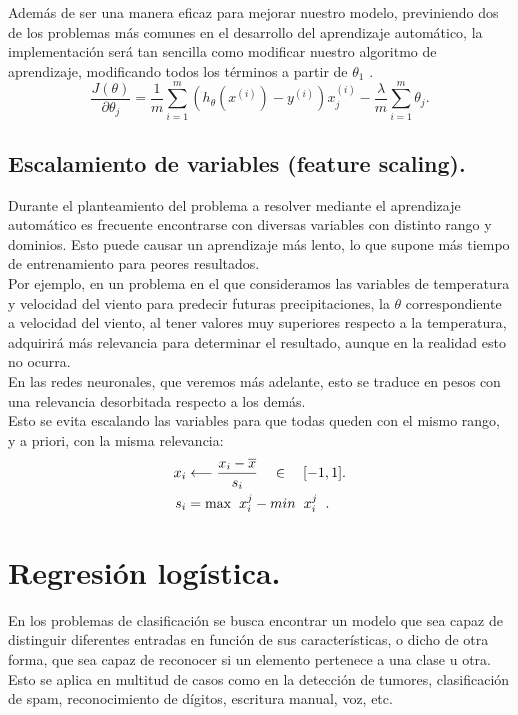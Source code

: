 \documentclass[a4paper,11pt]{article}
\begin{document}
\noindent
Además de ser una manera eficaz para mejorar nuestro modelo, previniendo dos de los problemas más comunes en el desarrollo del aprendizaje automático, la implementación será tan sencilla como modificar nuestro algoritmo de aprendizaje, modificando todos los términos a partir de $\theta_1$ .\\
\begin{equation}
\frac{J(\theta)}{\partial\theta_j} = \frac{1}{m} \sum_{i=1}^{m} \left(h_\theta (x^{(i)})-y^{(i)}\right) x_{j}^{(i)}-\frac{\lambda}{m} \sum_{i=1}^{m} \theta_j.
\end{equation}

\subsection{Escalamiento de variables (feature scaling).}

Durante el planteamiento del problema a resolver mediante el aprendizaje automático es frecuente encontrarse con diversas variables con distinto rango y dominios. Esto puede causar un aprendizaje más lento, lo que supone más tiempo de entrenamiento para peores resultados. \\

\noindent
Por ejemplo, en un problema en el que consideramos las variables de temperatura y velocidad del viento para predecir futuras precipitaciones, la $\theta$ correspondiente a  velocidad del viento, al tener valores muy superiores respecto a la temperatura, adquirirá más relevancia para determinar el resultado, aunque en la realidad esto no ocurra.\\ 

\noindent
En las redes neuronales, que veremos más adelante, esto se traduce en pesos con una relevancia desorbitada respecto a los demás.\\

\noindent
Esto se evita escalando las variables para que todas queden con el mismo rango, y a priori, con la misma relevancia:
\begin{align}
x_i &\longleftarrow \frac{x_i - \overline{x}}{s_i}\quad \in \quad [-1,1].\\
s_i &= \text{max}\hspace{0.20cm}x_{i}^j -min\hspace{0.20cm}x_{i}^j \hspace{0.20cm}.
\end{align}
\newpage
\section{Regresión logística.}
En los problemas de clasificación se busca encontrar un modelo que sea capaz de distinguir diferentes entradas en función de sus características, o dicho de otra forma, que sea capaz de reconocer si un elemento pertenece a una clase u otra. Esto se aplica
en multitud de casos como en la detección de tumores, clasificación de spam,
reconocimiento de dígitos, escritura manual, voz, etc.\\
\end{document}
